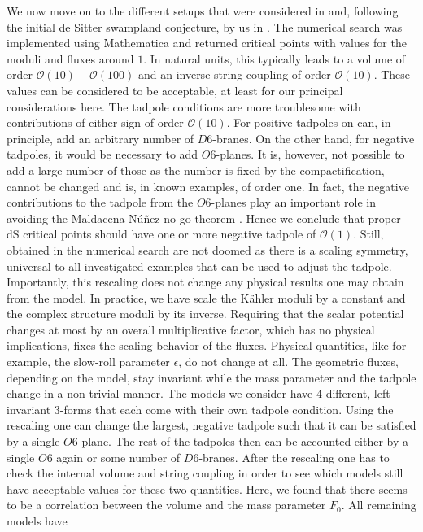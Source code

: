 \documentclass[12pt]{report}
\begin{document}
We now move on to the different setups that were considered in \cite{Danielsson:2012et} and, following the initial de Sitter swampland conjecture, by us in \cite{Roupec:2018mbn}. The numerical search was implemented using Mathematica and returned critical points with values for the moduli and fluxes around $1$. In natural units, this typically leads to a volume of order $\mathcal{O}(10)-\mathcal{O}(100)$ and an inverse string coupling of order $\mathcal{O}(10)$. These values can be considered to be acceptable, at least for our principal considerations here. The tadpole conditions are more troublesome with contributions of either sign of order $\mathcal{O}(10)$. For positive tadpoles on can, in principle, add an arbitrary number of $D6$-branes. On the other hand, for negative tadpoles, it would be necessary to add $O6$-planes. It is, however, not possible to add a large number of those as the number is fixed by the compactification, cannot be changed and is, in known examples, of order one. In fact, the negative contributions to the tadpole from the $O6$-planes play an important role in avoiding the Maldacena-N\'{u}\~{n}ez no-go theorem \cite{Maldacena:2000mw}. Hence we conclude that proper dS critical points should have one or more negative tadpole of $\mathcal{O}(1)$. Still, obtained in the numerical search are not doomed as there is a scaling symmetry, universal to all investigated examples that can be used to adjust the tadpole. Importantly, this rescaling does not change any physical results one may obtain from the model. In practice, we have scale the Kähler moduli by a constant and the complex structure moduli by its inverse. Requiring that the scalar potential changes at most by an overall multiplicative factor, which has no physical implications, fixes the scaling behavior of the fluxes. Physical quantities, like for example, the slow-roll parameter $\epsilon$, do not change at all. The geometric fluxes, depending on the model, stay invariant while the mass parameter and the tadpole change in a non-trivial manner. The models we consider have $4$ different, left-invariant $3$-forms that each come with their own tadpole condition. Using the rescaling one can change the largest, negative tadpole such that it can be satisfied by a single $O6$-plane. The rest of the tadpoles then can be accounted either by a single $O6$ again or some number of $D6$-branes. After the rescaling one has to check the internal volume and string coupling in order to see which models still have acceptable values for these two quantities. Here, we found that there seems to be a correlation between the volume and the mass parameter $F_0$. All remaining models have
\end{document}
